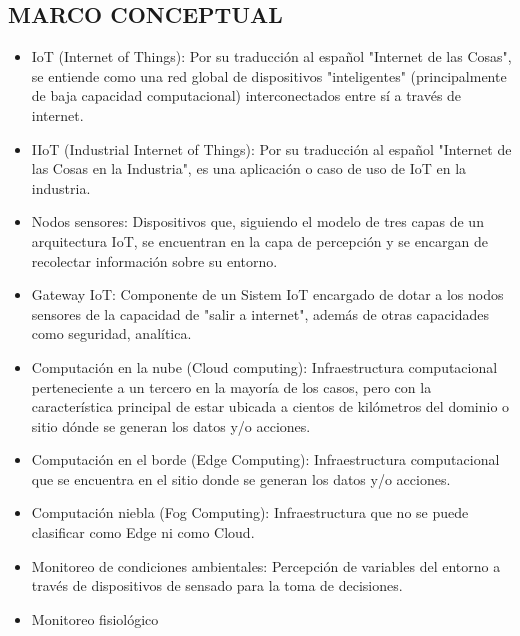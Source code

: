 \documentclass[stu,12pt,floatsintext]{apa7}
\begin{document}
	
	
	\subsection{MARCO CONCEPTUAL}
		\begin{itemize}
		\item IoT (Internet of Things): Por su traducción al español "Internet de las Cosas", se entiende como una red global de dispositivos "inteligentes" (principalmente de baja capacidad computacional) interconectados entre sí a través de internet.
		\item IIoT (Industrial Internet of Things): Por su traducción al español "Internet de las Cosas en la Industria", es una aplicación o caso de uso de IoT en la industria.
		\item Nodos sensores: Dispositivos que, siguiendo el modelo de tres capas de un arquitectura IoT, se encuentran en la capa de percepción y se encargan de recolectar información sobre su entorno.
		\item Gateway IoT: Componente de un Sistem IoT encargado de dotar a los nodos sensores de la capacidad de "salir a internet", además de otras capacidades como seguridad, analítica.
		\item Computación en la nube (Cloud computing): Infraestructura computacional perteneciente a un tercero en la mayoría de los casos, pero con la característica principal de estar ubicada a cientos de kilómetros del dominio o sitio dónde se generan los datos y/o acciones.
		\item Computación en el borde (Edge Computing): Infraestructura computacional que se encuentra en el sitio donde se generan los datos y/o acciones.
		\item Computación niebla (Fog Computing): Infraestructura que no se puede clasificar como Edge ni como Cloud.
		\item Monitoreo de condiciones ambientales: Percepción de variables del entorno a través de dispositivos de sensado para la toma de decisiones.
		\item Monitoreo fisiológico %

\end{itemize}
\end{document}

